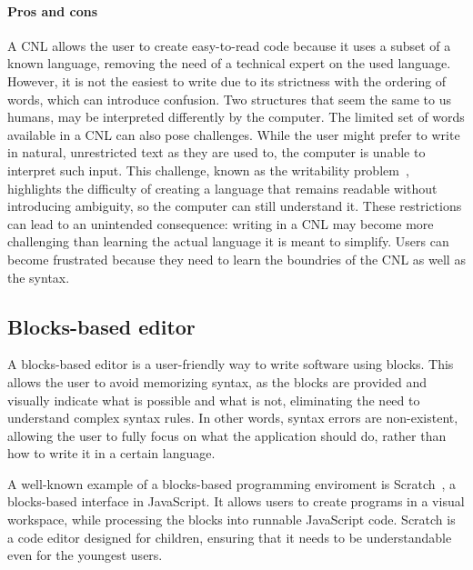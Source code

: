 \documentclass[11pt,a4paper]{report}
\begin{document}
\paragraph{Pros and cons}
A CNL allows the user to create easy-to-read code because it uses a subset of a known language, removing the need of a technical expert on the used language. However, it is not the easiest to write due to its strictness with the ordering of words, which can introduce confusion. Two structures that seem the same to us humans, may be interpreted differently by the computer. The limited set of words available in a CNL can also pose challenges. While the user might prefer to write in natural, unrestricted text as they are used to, the computer is unable to interpret such input. This challenge, known as the writability problem~\cite{CNL}, highlights the difficulty of creating a language that remains readable without introducing ambiguity, so the computer can still understand it.
These restrictions can lead to an unintended consequence: writing in a CNL may become more challenging than learning the actual language it is meant to simplify. Users can become frustrated because they need to learn the boundries of the CNL as well as the syntax.

\subsection{Blocks-based editor}
A blocks-based editor is a user-friendly way to write software using blocks. This allows the user to avoid memorizing syntax, as the blocks are provided and visually indicate what is possible and what is not, eliminating the need to understand complex syntax rules. In other words, syntax errors are non-existent, allowing the user to fully focus on what the application should do, rather than how to write it in a certain language.

A well-known example of a blocks-based programming enviroment is Scratch~\cite{scratch}, a blocks-based interface in JavaScript. It allows users to create programs in a visual workspace, while processing the blocks into runnable JavaScript code. Scratch is a code editor designed for children, ensuring that it needs to be understandable even for the youngest users.
\end{document}
